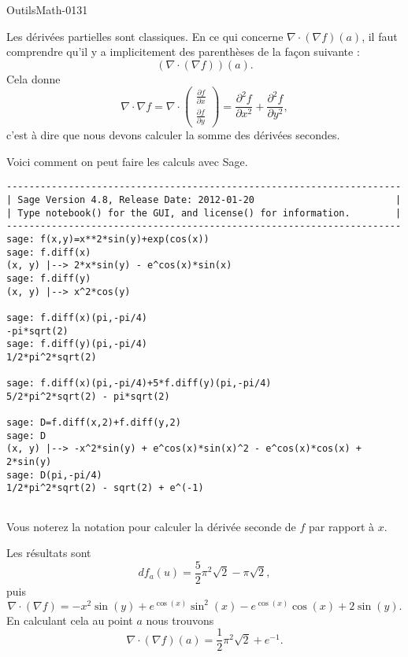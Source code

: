 
\begin{corrige}{OutilsMath-0131}

    Les dérivées partielles sont classiques. En ce qui concerne \( \nabla\cdot(\nabla f)(a)\), il faut comprendre qu'il y a implicitement des parenthèses de la façon suivante :
    \begin{equation}
        \left( \nabla\cdot (\nabla f) \right)(a).
    \end{equation}
    Cela donne
    \begin{equation}
        \nabla \cdot\nabla f=\nabla\cdot\begin{pmatrix}
            \frac{ \partial f }{ \partial x }    \\ 
            \frac{ \partial f }{ \partial y }    
        \end{pmatrix}=\frac{ \partial^2f }{ \partial x^2 }+\frac{ \partial^2f }{ \partial y^2 },
    \end{equation}
    c'est à dire que nous devons calculer la somme des dérivées secondes.

    Voici comment on peut faire les calculs avec Sage.
    \begin{verbatim}
----------------------------------------------------------------------
| Sage Version 4.8, Release Date: 2012-01-20                         |
| Type notebook() for the GUI, and license() for information.        |
----------------------------------------------------------------------
sage: f(x,y)=x**2*sin(y)+exp(cos(x))
sage: f.diff(x)
(x, y) |--> 2*x*sin(y) - e^cos(x)*sin(x)
sage: f.diff(y)
(x, y) |--> x^2*cos(y)

sage: f.diff(x)(pi,-pi/4)
-pi*sqrt(2)
sage: f.diff(y)(pi,-pi/4)
1/2*pi^2*sqrt(2)

sage: f.diff(x)(pi,-pi/4)+5*f.diff(y)(pi,-pi/4)
5/2*pi^2*sqrt(2) - pi*sqrt(2)

sage: D=f.diff(x,2)+f.diff(y,2)
sage: D
(x, y) |--> -x^2*sin(y) + e^cos(x)*sin(x)^2 - e^cos(x)*cos(x) + 2*sin(y)
sage: D(pi,-pi/4)
1/2*pi^2*sqrt(2) - sqrt(2) + e^(-1)
    
    \end{verbatim}

    Vous noterez la notation  pour calculer la dérivée seconde de \( f\) par rapport à \( x\).

    Les résultats sont
    \begin{equation}
        df_a(u)=\frac{ 5 }{ 2 }\pi^2\sqrt{2}-\pi\sqrt{2},
    \end{equation}
    puis
    \begin{equation}
        \nabla\cdot(\nabla f)=-x^2\sin(y)+ e^{\cos(x)}\sin^2(x)- e^{\cos(x)}\cos(x)+2\sin(y).
    \end{equation}
    En calculant cela au point \( a\) nous trouvons
    \begin{equation}
        \nabla\cdot(\nabla f)(a)=\frac{ 1 }{2}\pi^2\sqrt{2}+e^{-1}.
    \end{equation}

\end{corrige}
